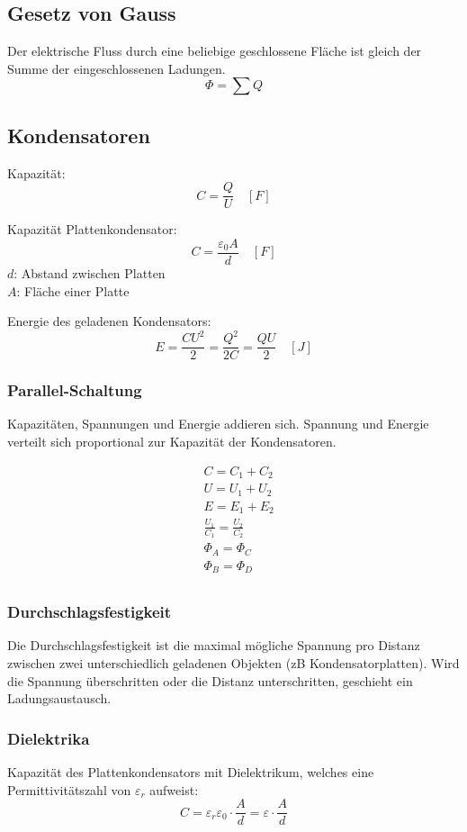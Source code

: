 \subsection{Gesetz von Gauss}

Der elektrische Fluss durch eine beliebige geschlossene Fläche ist gleich der
Summe der eingeschlossenen Ladungen.
\[
	\Phi = \sum Q
\]

\subsection{Kondensatoren}

Kapazität:
\[
	C = \frac{Q}{U} \quad \left[F\right]
\]

Kapazität Plattenkondensator:
\[
	C = \frac{\varepsilon_0 A}{d} \quad \left[F\right]
\]
$d$: Abstand zwischen Platten\\
$A$: Fläche einer Platte

Energie des geladenen Kondensators:
\[
	E = \frac{CU^2}{2} = \frac{Q^2}{2C} = \frac{QU}{2} \quad \left[J\right]
\]

\subsubsection{Parallel-Schaltung}

Kapazitäten, Spannungen und Energie addieren sich. Spannung und Energie verteilt
sich proportional zur Kapazität der Kondensatoren.

\begin{minipage}{.5\linewidth}
	
\end{minipage}
\begin{minipage}{.5\linewidth}
	\begin{align*}
		& C = C_1 + C_2 \\
		& U = U_1 + U_2 \\
		& E = E_1 + E_2 \\
		& \frac{U_1}{C_1} = \frac{U_2}{C_2} \\
		& \Phi_A = \Phi_C \\
		& \Phi_B = \Phi_D \\
	\end{align*}
\end{minipage}

\subsubsection{Durchschlagsfestigkeit}

Die Durchschlagsfestigkeit ist die maximal mögliche Spannung pro Distanz
zwischen zwei unterschiedlich geladenen Objekten (zB Kondensatorplatten). Wird
die Spannung überschritten oder die Distanz unterschritten, geschieht ein
Ladungsaustausch.

\subsubsection{Dielektrika}

Kapazität des Plattenkondensators mit Dielektrikum, welches eine
Permittivitätszahl von $\varepsilon_r$ aufweist:
\[
	C = \varepsilon_r \varepsilon_0 \cdot \frac{A}{d} = \varepsilon \cdot \frac{A}{d}
\]
